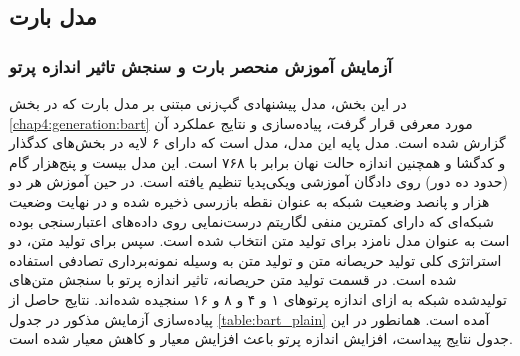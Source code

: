 \subsection{مدل بارت}

\subsubsection{آزمایش آموزش منحصر بارت و سنجش تاثیر اندازه پرتو} \label{chap5:bart:plain}
در این بخش،‌ مدل پیشنهادی گپ‌زنی مبتنی بر مدل بارت که در بخش 
\ref{chap4:generation:bart}
مورد معرفی قرار گرفت، پیاده‌سازی و نتایج عملکرد آن گزارش شده است. مدل پایه این مدل، مدل 
است که دارای ۶ لایه در بخش‌های کدگذار و کدگشا و همچنین اندازه حالت نهان برابر با ۷۶۸ است. این مدل بیست و پنج‌هزار گام (حدود ده دور) روی دادگان آموزشی ویکی‌پدیا تنظیم یافته است. 
در حین آموزش هر دو هزار و پانصد وضعیت شبکه به عنوان نقطه بازرسی ذخیره شده و در نهایت وضعیت شبکه‌ای که دارای کمترین منفی لگاریتم درست‌نمایی روی داده‌های اعتبارسنجی بوده است به عنوان مدل نامزد برای تولید متن انتخاب شده است. 
سپس برای تولید متن،‌ دو استراتژی کلی تولید حریصانه متن و تولید متن به وسیله نمونه‌برداری تصادفی استفاده شده است. در قسمت تولید متن حریصانه، تاثیر اندازه پرتو با سنجش متن‌های تولید‌شده شبکه به ازای اندازه پرتو‌های ۱ و ۴ و ۸ و ۱۶ سنجیده شده‌اند. نتایج حاصل از پیاده‌سازی آزمایش مذکور در جدول 
\ref{table:bart_plain}
آمده است. همانطور در این جدول نتایج پیداست، افزایش اندازه پرتو باعث افزایش معیار
و کاهش معیار 
شده است.



